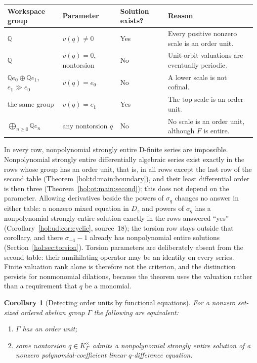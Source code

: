 \documentclass[11pt]{article}
\numberwithin{equation}{section}
\newtheorem{corollary}[theorem]{Corollary}
\theoremstyle{definition}
\theoremstyle{remark}
\newcommand{\Q}{\mathbb Q}
\newcommand{\K}{K_\Gamma}
\begin{document}
\begin{center}
\small
\begin{tabularx}{\textwidth}{@{}l l l X@{}}
\toprule
Workspace group & Parameter & Solution exists? & Reason\\
\midrule
$\Q$ & $v(q)\ne0$ & Yes & Every positive nonzero scale is an order unit.\\
$\Q$ & $v(q)=0$, nontorsion & No & Unit-orbit valuations are eventually
periodic.\\
$\Q e_0\oplus\Q e_1$, $e_1\gg e_0$ & $v(q)=e_0$ & No & A lower scale is not
cofinal.\\
the same group & $v(q)=e_1$ & Yes & The top scale is an order unit.\\
$\bigoplus_{n\ge0}\Q e_n$ & any nontorsion $q$ & No & No scale is an order
unit, although $F$ is entire.\\
\bottomrule
\end{tabularx}
\end{center}

In every row, nonpolynomial strongly entire D-finite series are impossible.
Nonpolynomial strongly entire differentially algebraic series exist exactly in
the rows whose group has an order unit, that is, in all rows except the last
row of the second table (Theorem~\ref{hol:td:main:boundary}), and their least
differential order is then three (Theorem~\ref{hol:ot:main:second}); this does
not depend on the parameter. Allowing derivatives beside the powers of
$\sigma_q$ changes no answer in either table: a nonzero mixed equation in
$D_z$ and powers of $\sigma_q$ has a nonpolynomial strongly entire solution
exactly in the rows answered ``yes'' (Corollary~\ref{hol:ud:cor:cyclic},
source~18); the torsion row stays outside that corollary, and there
$\sigma_{-1}-1$ already has nonpolynomial entire solutions
(Section~\ref{hol:sec:torsion}).
Torsion parameters are deliberately absent from the second table: their
annihilating operator may be an identity on every series. Finite valuation
rank alone is therefore not the criterion, and the distinction persists for
nonmonomial dilations, because the theorem uses the valuation rather than a
requirement that $q$ be a monomial.

\begin{corollary}[Detecting order units by functional equations]
\label{hol:cor:detect}
For a nonzero set-sized ordered abelian group $\Gamma$ the following are
equivalent:
\begin{enumerate}[label=\textup{(\roman*)}]
\item $\Gamma$ has an order unit;
\item some nontorsion $q\in\K^\times$ admits a nonpolynomial strongly entire
solution of a nonzero polynomial-coefficient linear $q$-difference equation.
\end{enumerate}
\end{corollary}
\end{document}
